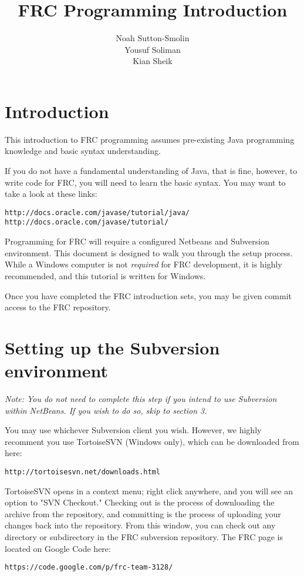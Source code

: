 \documentclass[a4paper]{article}
\title{FRC Programming Introduction}
\author{Noah Sutton-Smolin\\Yousuf Soliman\\Kian Sheik}
\begin{document}
\maketitle

\section{Introduction}

This introduction to FRC programming assumes pre-existing Java programming knowledge and basic syntax understanding.

If you do not have a fundamental understanding of Java, that is fine, however, to write code for FRC, you will need to learn the basic syntax. You may want to take a look at these links:

\begin{verbatim}http://docs.oracle.com/javase/tutorial/java/
http://docs.oracle.com/javase/tutorial/\end{verbatim}

Programming for FRC will require a configured Netbeans and Subversion environment. This document is designed to walk you through the setup process. While a Windows computer is not \textit{required} for FRC development, it is highly recommended, and this tutorial is written for Windows.

Once you have completed the FRC introduction sets, you may be given commit access to the FRC repository.

\section{Setting up the Subversion environment}

\textit{Note: You do not need to complete this step if you intend to use Subversion within NetBeans. If you wish to do so, skip to section 3.}\newline

You may use whichever Subversion client you wish. However, we highly recomment you use TortoiseSVN (Windows only), which can be downloaded from here: \begin{verbatim}http://tortoisesvn.net/downloads.html\end{verbatim}

TortoiseSVN opens in a context menu; right click anywhere, and you will see an option to "SVN Checkout." Checking out is the process of downloading the archive from the repository, and committing is the process of uploading your changes back into the repository. From this window, you can check out any directory or subdirectory in the FRC subversion repository. The FRC page is located on Google Code here:\begin{verbatim}https://code.google.com/p/frc-team-3128/\end{verbatim}
\end{document}
